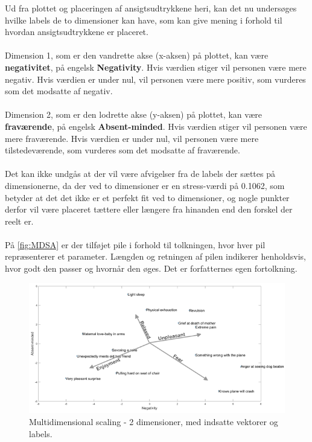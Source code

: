 \noindent Ud fra plottet og placeringen af ansigtsudtrykkene heri, kan det nu undersøges hvilke labels de to dimensioner kan have, som kan give mening i forhold til hvordan ansigtsudtrykkene er placeret. 
\\\\
Dimension 1, som er den vandrette akse (x-aksen) på plottet, kan være \textbf{negativitet}, på engelsk \textbf{Negativity}. Hvis værdien stiger vil personen være mere negativ. Hvis værdien er under nul, vil personen være mere positiv, som vurderes som det modsatte af negativ. 
\\\\
Dimension 2, som er den lodrette akse (y-aksen) på plottet, kan være \textbf{fraværende}, på engelsk \textbf{Absent-minded}. Hvis værdien stiger vil personen være mere fraværende. Hvis værdien er under nul, vil personen være mere tilstedeværende, som vurderes som det modsatte af fraværende. 
\\\\
Det kan ikke undgås at der vil være afvigelser fra de labels der sættes på dimensionerne, da der ved to dimensioner er en stress-værdi på 0.1062, som betyder at det det ikke er et perfekt fit ved to dimensioner, og nogle punkter derfor vil være placeret tættere eller længere fra hinanden end den forskel der reelt er.
\\\\
På \autoref{fig:MDSA} er der tilføjet pile i forhold til tolkningen, hvor hver pil repræsenterer et parameter. Længden og retningen af pilen indikerer henholdsvis, hvor godt den passer og hvornår den øges. Det er forfatternes egen fortolkning. 
%
\begin{figure}[H]
\centering
\includegraphics[width =\textwidth]{Figure/MSD_PlotArrows.png} 
\caption{Multidimensional scaling - 2 dimensioner, med indsatte vektorer og labels.}
\label{fig:MDSA}
\end{figure}
\noindent
%